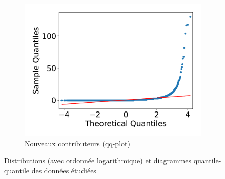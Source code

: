 \documentclass[dvipsnames,runningheads]{llncs}
\begin{document}
\begin{figure}[ht]
\begin{subfigure}[t]{0.333\textwidth}
            \includegraphics[width=\textwidth]{../experiment/data_analysis/newContributorCount_qqplot}
            \caption{Nouveaux contributeurs (qq-plot)}
            \label{sfig:newContributorQQplot}
        \end{subfigure}

        \caption{%
            Distributions (avec ordonnée logarithmique) et diagrammes quantile-quantile des données étudiées%
        }
        \label{fig:distribution}
    \end{figure}
\end{document}
